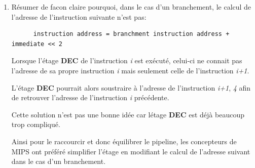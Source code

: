 \begin{enumerate}
    \begin{correction}

      L'instruction \textit{Andi Rt, Rs, Immed} effectue un \textit{ET logique}
      entre le registre source \textit{Rs} et l'imm\'ediat \textit{Immed}.

      Puis le r\'esultat sur 32-bit est rang\'e dans le registre destination
      \textit{Rt}.

      Pour pouvoir effectuer une op\'eration sur 32-bit les deux op\'erandes
      doivent \^etre sur 32-bit. Dans le cas d'une instruction avec
      un imm\'ediat, ce dernier est \'etendu \`a une valeur sur 32-bit.

      Puisque l'instruction \textit{Andi} est une op\'eration logique
      et non arithm\'etique, l'imm\'ediat sera consid\'er\'e comme
      un nombre non-sign\'e.

      De ce fait les 16 bits de poids forts seront tous simplement
      remplis de z\'eros et l'op\'eration pourra \^etre effectu\'ee
      correctement.

    \end{correction}
  \item
    R\'esumer de facon claire pourquoi, dans le cas d'un branchement,
    le calcul de l'adresse de l'instruction suivante n'est pas:

    \begin{verbatim}
      instruction address = branchment instruction address + immediate << 2
    \end{verbatim}

    \begin{correction}

      Lorsque l'\'etage \textbf{DEC} de l'instruction \textit{i} est
      ex\'ecut\'e, celui-ci ne connait pas l'adresse de sa propre instruction
      \textit{i} mais seulement celle de l'instruction \textit{i+1}.

      L'\'etage \textbf{DEC} pourrait alors soustraire \`a l'adresse de
      l'instruction \textit{i+1}, \textit{4} afin de retrouver l'adresse
      de l'instruction \textit{i} pr\'ec\'edente.

      Cette solution n'est pas une bonne id\'ee car l\'etage \textbf{DEC}
      est d\'ej\`a beaucoup trop compliqu\'e.

      Ainsi pour le raccourcir et donc \'equilibrer le pipeline, les
      concepteurs de MIPS ont pr\'ef\'er\'e simplifier l'\'etage en
      modifiant le calcul de l'adresse suivant dans le cas d'un branchement.


\end{correction}
\end{enumerate}
